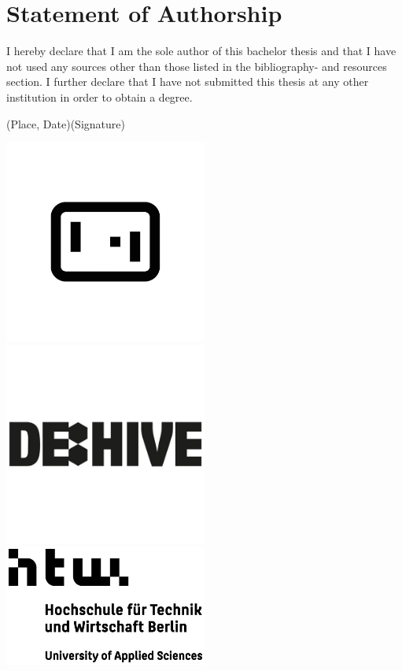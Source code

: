 \documentclass[a4paper, twoside, 10pt]{report}
\begin{document}
\chapter*{Statement of Authorship}
I hereby declare that I am the sole author of this bachelor thesis and that I have not used any sources other than those listed in the bibliography- and resources section. I further declare that I have not submitted this thesis at any other institution in order to obtain a degree.
\begin{spacing}{4}
\noindent
(Place, Date)\dotfill \space (Signature)\dotfill
\end{spacing}

\newpage
\pagestyle{empty}
\centering
\vfill
\includegraphics[width=0.5\textwidth]{Images/logo_GD_black.jpg}
\vfill
\vspace*{-2cm}
\includegraphics[width=0.5\textwidth]{Images/logo_dehive.jpg}
\vfill
\includegraphics[width=0.5\textwidth]{Images/logo_htw.jpg}
\vfill
\end{document}
